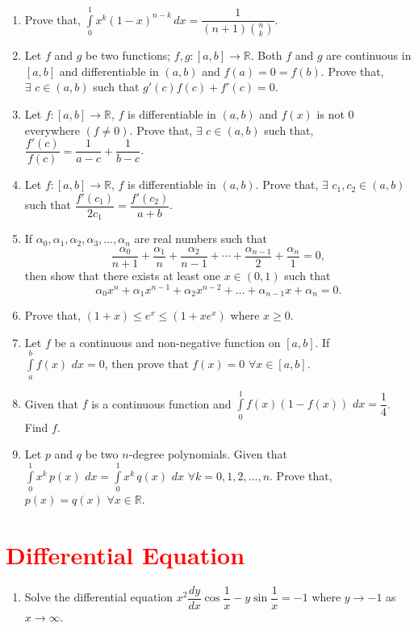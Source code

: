 \documentclass[11pt, a4paper]{article}
\begin{document}
\begin{enumerate}
	\item Prove that, $\displaystyle{\int \limits_{0}^{1} x^k (1-x)^{n-k} \, dx} = \dfrac{1}{(n+1) \binom{n}{k}}$.
	
	\item Let $f$ and $g$ be two functions; $f, g : [a, b] \rightarrow \mathbb{R}$. Both $f$ and $g$ are continuous in $[a, b]$ and differentiable in $(a, b)$ and $f(a) = 0 = f(b)$. Prove that, $\exists \,\, c \in (a, b)$ such that $g' (c) f(c) + f'(c) = 0$.
	
	\item Let $f : [a, b] \rightarrow \mathbb{R}$, $f$ is differentiable in $(a, b)$ and $f(x)$ is not 0 everywhere $(f \neq 0)$. Prove that, $\exists \,\, c\in (a, b)$ such that, $\dfrac{f'(c)}{f(c)} = \dfrac{1}{a-c} + \dfrac{1}{b-c}$.
	
	\item Let $f : [a, b] \rightarrow \mathbb{R}$, $f$ is differentiable in $(a, b)$. Prove that, $\exists \,\, c_1, c_2 \in (a, b)$ such that $\dfrac{f'(c_1)}{2c_1} = \dfrac{f'(c_2)}{a+b}$.
	
	\item If $\alpha_0, \alpha_1, \alpha_2, \alpha_3, \ldots, \alpha_n$ are real numbers such that $$\dfrac{\alpha_0}{n+1} + \dfrac{\alpha_1}{n} + \dfrac{\alpha_2}{n-1} + \cdots + \dfrac{\alpha_{n-1}}{2} + \dfrac{\alpha_n}{1} = 0,$$ then show that there exists at least one $x \in (0, 1)$ such that $$\alpha_0 x^n + \alpha_1 x^{n-1} + \alpha_2 x^{n-2} + \ldots + \alpha_{n-1}x + \alpha_n = 0.$$
	
	\item Prove that, $(1+x) \leq e^x \leq (1+xe^x)$ where $x \geq 0$.
	
	\item Let $f$ be a continuous and non-negative function on $[a, b]$. If $\displaystyle{\int \limits_a^b f(x) \,\, dx = 0}$, then prove that $f(x) = 0 \,\, \forall x \in [a, b]$.
	
	\item Given that $f$ is a continuous function and $\displaystyle{\int \limits_0^1 f(x) (1-f(x)) \,\, dx = \dfrac{1}{4}}$. Find $f$.
	
	\item Let $p$ and $q$ be two $n$-degree polynomials. Given that $\displaystyle{\int \limits_0^1 x^k \, p(x) \,\, dx = \int \limits_0^1 x^k \, q(x) \,\, dx}$ $\forall k = 0, 1, 2, \ldots, n$. Prove that, $p(x) = q(x)$ $\forall x \in \mathbb{R}$.
	
\end{enumerate}








\section{\textcolor{red}{Differential Equation}}

\begin{enumerate}

	\item Solve the differential equation $x^2 \dfrac{dy}{dx} \cos \dfrac{1}{x} - y \sin \dfrac{1}{x} = -1$ where $y \rightarrow -1$ as $x \rightarrow \infty$.
\end{enumerate}
\end{document}
